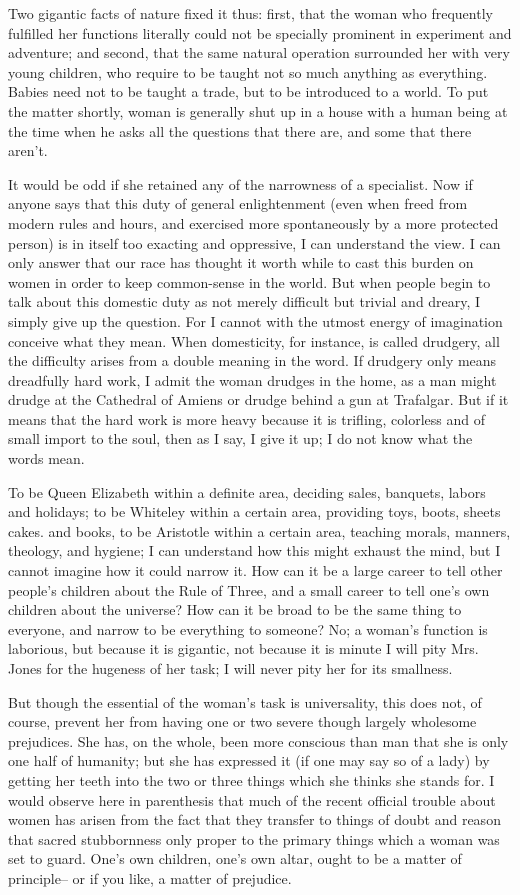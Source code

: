 \documentclass[final,10pt,letterpaper,twocolumn,openany]{book}
\begin{document}
Two gigantic facts of
nature fixed it thus: first, that the woman who frequently fulfilled her
functions literally could not be specially prominent in experiment and
adventure; and second, that the same natural operation surrounded her
with very young children, who require to be taught not so much anything
as everything. Babies need not to be taught a trade, but to be introduced to
a world. To put the matter shortly, woman is generally shut up in a house
with a human being at the time when he asks all the questions that there
are, and some that there aren't. 

It would be odd if she retained any of the
narrowness of a specialist. Now if anyone says that this duty of general
enlightenment (even when freed from modern rules and hours, and
exercised more spontaneously by a more protected person) is in itself too
exacting and oppressive, I can understand the view. I can only answer that
our race has thought it worth while to cast this burden on women in order
to keep common-sense in the world. But when people begin to talk about
this domestic duty as not merely difficult but trivial and dreary, I simply
give up the question. For I cannot with the utmost energy of imagination
conceive what they mean. When domesticity, for instance, is called
drudgery, all the difficulty arises from a double meaning in the word. If
drudgery only means dreadfully hard work, I admit the woman drudges in
the home, as a man might drudge at the Cathedral of Amiens or drudge
behind a gun at Trafalgar. But if it means that the hard work is more heavy
because it is trifling, colorless and of small import to the soul, then as I say,
I give it up; I do not know what the words mean. 

To be Queen Elizabeth
within a definite area, deciding sales, banquets, labors and holidays; to be
Whiteley within a certain area, providing toys, boots, sheets cakes. and
books, to be Aristotle within a certain area, teaching morals, manners,
theology, and hygiene; I can understand how this might exhaust the mind,
but I cannot imagine how it could narrow it. How can it be a large career
to tell other people's children about the Rule of Three, and a small career
to tell one's own children about the universe? How can it be broad to be
the same thing to everyone, and narrow to be everything to someone? No;
a woman's function is laborious, but because it is gigantic, not because it is
minute I will pity Mrs. Jones for the hugeness of her task; I will never pity
her for its smallness.

But though the essential of the woman's task is universality, this does
not, of course, prevent her from having one or two severe though largely
wholesome prejudices. She has, on the whole, been more conscious than
man that she is only one half of humanity; but she has expressed it (if one
may say so of a lady) by getting her teeth into the two or three things
which she thinks she stands for. I would observe here in parenthesis that
much of the recent official trouble about women has arisen from the fact
that they transfer to things of doubt and reason that sacred stubbornness
only proper to the primary things which a woman was set to guard. One's
own children, one's own altar, ought to be a matter of principle-- or if you
like, a matter of prejudice. 
\end{document}
